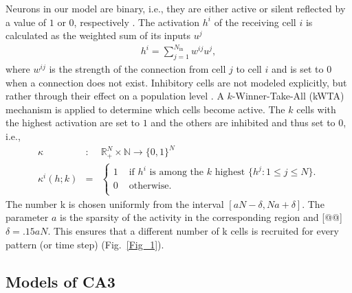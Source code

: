 \documentclass[utf8]{frontiersSCNS} %
\begin{document}
Neurons in our model are binary, i.e., they are either active or silent reflected by a value of $1$ or $0$, respectively \citep{fontanari1995model}.
%
The activation $h^i$ of the receiving cell $i$ is calculated as the weighted sum of its inputs $u^j$
\begin{align}
	\label{activation}
	h^i = \sum_{j=1}^{N_\mathrm{in}} w^{ij}u^j,
\end{align}  
where $w^{ij}$ is the strength of the connection from cell $j$ to cell $i$ and is set to $0$ when a connection does not exist. Inhibitory cells are not modeled explicitly, but rather through their effect on a population level \citep{renno2010mechanism, roudi2008representing, moustafa2009neurocomputational, appleby2011role, monaco2011modular}. A $k$-Winner-Take-All (kWTA) mechanism is applied to determine which cells become active. The $k$ cells with the highest activation are set to $1$ and the others are inhibited and thus set to $0$, i.e.,
\begin{eqnarray}
\label{eq:kWTA}
	\kappa &:& \mathbb{R}_+^N \times \mathbb{N} \to \{0,1\}^N \\
	\kappa^i (h;k) &=& \left \{ \begin{array}{ll}
			1 &\text{ if $h^i$ is among the $k$ highest } \{ h^j:1\le j\le N \}. \\
			0 &\text{ otherwise}.\\
	\end{array} \right.
	\label{eq:binary}
\end{eqnarray}
The number k is chosen uniformly from the interval $ [aN - \delta , Na + \delta ]$. The parameter $a$ is the sparsity of the activity in the corresponding region and [@@] $\delta = .15 aN$. This ensures that a different number of k cells is recruited for every pattern (or time step) (Fig.~\ref{Fig_1}).


\subsection{Models of CA3}
\label{ca3:models}
\end{document}
